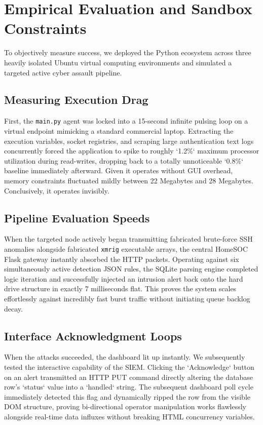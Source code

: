 \documentclass[conference]{IEEEtran}
\begin{document}
\section{Empirical Evaluation and Sandbox Constraints}

To objectively measure success, we deployed the Python ecosystem across three heavily isolated Ubuntu virtual computing environments and simulated a targeted active cyber assault pipeline.

\subsection{Measuring Execution Drag}
First, the \verb|main.py| agent was locked into a 15-second infinite pulsing loop on a virtual endpoint mimicking a standard commercial laptop. Extracting the execution variables, socket registries, and scraping large authentication text logs concurrently forced the application to spike to roughly `1.2\%` maximum processor utilization during read-writes, dropping back to a totally unnoticeable `0.8\%` baseline immediately afterward. Given it operates without GUI overhead, memory constraints fluctuated mildly between 22 Megabytes and 28 Megabytes. Conclusively, it operates invisibly.

\subsection{Pipeline Evaluation Speeds}
When the targeted node actively began transmitting fabricated brute-force SSH anomalies alongside fabricated \verb|xmrig| executable arrays, the central HomeSOC Flask gateway instantly absorbed the HTTP packets. Operating against six simultaneously active detection JSON rules, the SQLite parsing engine completed logic iteration and successfully injected an intrusion alert back onto the hard drive structure in exactly 7 milliseconds flat. This proves the system scales effortlessly against incredibly fast burst traffic without initiating queue backlog decay.

\subsection{Interface Acknowledgment Loops}
When the attacks succeeded, the dashboard lit up instantly. We subsequently tested the interactive capability of the SIEM. Clicking the `Acknowledge` button on an alert transmitted an HTTP PUT command directly altering the database row's `status` value into a `handled` string. The subsequent dashboard poll cycle immediately detected this flag and dynamically ripped the row from the visible DOM structure, proving bi-directional operator manipulation works flawlessly alongside real-time data influxes without breaking HTML concurrency variables.
\end{document}
